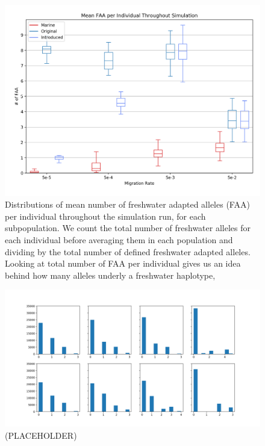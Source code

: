 \documentclass{article}
\begin{document}
\begin{figure}
	\begin{center}
  		\includegraphics[width=\linewidth]{matplotlibPlots/MFAI.png}
  		\caption{Distributions of mean number of freshwater adapted alleles (FAA) per individual throughout the simulation run, for each subpopulation.
		We count the total number of freshwater alleles for each individual before averaging them in each population and dividing by the total number of defined
		freshwater adapted alleles.
		Looking at total number of FAA per individual gives us an idea behind how many alleles underly a freshwater haplotype, 
		}
  		\label{fig:MNFAI}
	\end{center}
\end{figure}

\begin{figure}
	\begin{center}
  		\includegraphics[width=\linewidth]{matplotlibPlots/effectRegionCounts.png}
  		\caption{(PLACEHOLDER)}
		\label{fig:counts}
	\end{center}
\end{figure}
\end{document}

